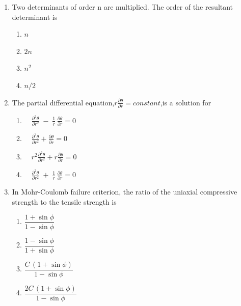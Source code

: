 \documentclass[journal,12pt,onecolumn]{IEEEtran}
\theoremstyle{remark}
\begin{document}
\begin{enumerate}
\hfill{}
\begin{multicols}{4}
\begin{enumerate}
\item $\infty$
\item $1$
\item $0$
\item $\frac{1}{2}$
\end{enumerate}
\end{multicols}
\item Two determinants of order n are multiplied. The order of the resultant determinant is

\hfill{}
\begin{multicols}{4}
\begin{enumerate}
\item $n$
\item $2n$
\item $n^2$
\item $n/2$
\end{enumerate}
\end{multicols}
\item The partial differential equation,$r\frac{\partial \theta}{\partial r}=constant$,is a solution for

\hfill{}
\begin{multicols}{2}
\begin{enumerate}
\item $\quad \frac{\partial^2 \theta}{\partial r^2} \;-\; \frac{1}{r}\,\frac{\partial \theta}{\partial r} = 0$
\item $\quad \frac{\partial^2 \theta}{\partial r^2} + \frac{\partial \theta}{\partial r} = 0$
\item $\quad r^2 \frac{\partial^2 \theta}{\partial r^2}
         + r \frac{\partial \theta}{\partial r} = 0$
\item $\quad \frac{\partial^2 \theta}{\partial r^2} \;+\; \frac{1}{r}\,\frac{\partial \theta}{\partial r} = 0$
\end{enumerate}
\end{multicols}
\item In Mohr-Coulomb failure criterion, the ratio of the uniaxial compressive strength to the tensile strength is

\hfill{}
\begin{multicols}{2}
\begin{enumerate}
  \item $\dfrac{1 + \sin\phi}{1 - \sin\phi}$
  \item $\dfrac{1 - \sin\phi}{1 + \sin\phi}$
  \item $\dfrac{C\,(1 + \sin\phi)}{1 - \sin\phi}$
  \item $\dfrac{2C\,(1 + \sin\phi)}{1 - \sin\phi}$
\end{enumerate}
\end{multicols}


\end{enumerate}
\end{document}
